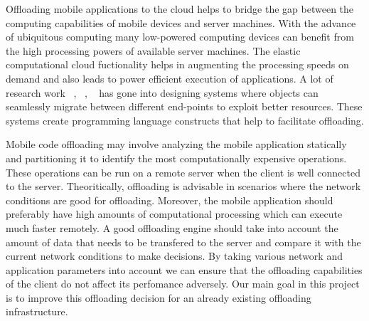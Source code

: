 Offloading mobile applications to the cloud helps to bridge the gap between the computing capabilities
of mobile devices and server machines. With the advance of ubiquitous computing many low-powered computing
devices can benefit from the high processing powers of available server machines. The elastic computational
cloud fuctionality helps in augmenting the processing speeds on demand and also leads to power efficient execution
of applications. A lot of research work ~\cite{netobj}, ~\cite{emerald}, ~\cite{tcl} has gone into designing systems where
objects can seamlessly migrate between different end-points to exploit better resources. These systems create
programming language constructs that help to facilitate offloading.

Mobile code offloading may involve analyzing the mobile application statically and partitioning it to identify the
most computationally expensive operations. These operations can be run on a remote server when the client is well
connected to the server. Theoritically, offloading is advisable in scenarios where the network conditions are good
for offloading. Moreover, the mobile application should preferably have high amounts of computational processing
which can execute much faster remotely. A good offloading engine should take into account the amount of data that
needs to be transfered to the server and compare it with the current network conditions to make decisions.
By taking various network and application parameters into account we can ensure that the offloading capabilities of the
client do not affect its perfomance adversely. Our main goal in this project is to improve this offloading
decision for an already existing offloading infrastructure.

